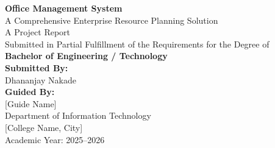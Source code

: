 ﻿\documentclass[12pt,a4paper]{report}
\begin{document}
\justifying

\begin{titlepage}
\centering
\vspace*{2cm}
{\Huge \textbf{Office Management System}} \\
\vspace{1.5cm}
{\Large A Comprehensive Enterprise Resource Planning Solution} \\
\vspace{1.5cm}
{\Large A Project Report} \\
\vspace{0.5cm}
{\large Submitted in Partial Fulfillment of the Requirements for the Degree of} \\
{\large \textbf{Bachelor of Engineering / Technology}} \\
\vspace{1.5cm}
\vspace{1.5cm}
{\large \textbf{Submitted By:}} \\
{\Large Dhananjay Nakade} \\
\vspace{1cm}
{\large \textbf{Guided By:}} \\
{\large [Guide Name]} \\
\vfill
{\large Department of Information Technology} \\
{\large [College Name, City]} \\
{\large Academic Year: 2025--2026} \\
\end{titlepage}
\end{document}
